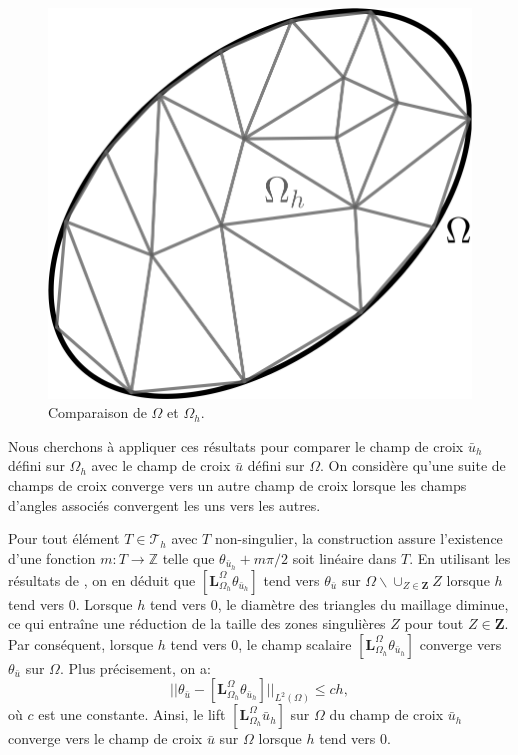 \begin{figure}[!h]
  \centering
  \includegraphics[scale=0.5]{images/Omega_vs_Omega_h.pdf}
  \caption{Comparaison de $\Omega$ et $\Omega_h$.}
  \label{fig:Omega_vs_Omega_h}
\end{figure}


Nous cherchons à appliquer ces résultats pour comparer le champ de croix $\bar{u}_h$ défini sur $\Omega_h$ avec le champ de croix $\bar{u}$ défini sur $\Omega$. On considère qu'une suite de champs de croix converge vers un autre champ de croix lorsque les champs d'angles associés convergent les uns vers les autres.

Pour tout élément $T\in\mathcal{T}_h$ avec $T$ non-singulier, la construction assure l'existence d'une fonction $m:T\longrightarrow \mathbb{Z}$ telle que $\theta_{\bar{u}_h}+m\pi/2$ soit linéaire dans $T$. En utilisant les résultats de \cite{dziuk1988finite}, on en déduit que $[\mathbf{L}_{\Omega_h}^{\Omega}\theta_{\bar{u}_h}]$ tend vers $\theta_{\bar{u}}$ sur $\Omega\backslash\cup_{Z\in\mathbf{Z}}Z$ lorsque $h$ tend vers $0$. Lorsque $h$ tend vers $0$, le diamètre des triangles du maillage diminue, ce qui entraîne une réduction de la taille des zones singulières $Z$ pour tout $Z\in\mathbf{Z}$. Par conséquent, lorsque $h$ tend vers $0$, le champ scalaire $[\mathbf{L}_{\Omega_h}^{\Omega}\theta_{\bar{u}_h}]$ converge vers $\theta_{\bar{u}}$ sur $\Omega$. Plus précisement, on a:
$$||\theta_{\bar{u}}-[\mathbf{L}_{\Omega_h}^{\Omega}\theta_{\bar{u}_h}]||_{L^2(\Omega)}\leq ch,$$
où $c$ est une constante. Ainsi, le lift $[\mathbf{L}_{\Omega_h}^{\Omega}\bar{u}_h]$ sur $\Omega$ du champ de croix $\bar{u}_h$ converge vers le champ de croix $\bar{u}$ sur $\Omega$ lorsque $h$ tend vers $0$.

